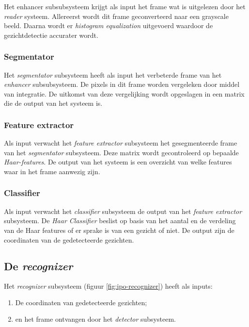 Het enhancer subsubsysteem krijgt als input het frame wat is uitgelezen door
het \emph{reader} systeem. Allereerst wordt dit frame geconverteerd naar een
grayscale beeld. Daarna wordt er \emph{histogram equalization} uitgevoerd
waardoor de gezichtdetectie accurater wordt.

\subsubsection{Segmentator}

Het \emph{segmentator} subsysteem heeft als input
het verbeterde frame van het \emph{enhancer} subsubsysteem. De pixels in dit
frame worden vergeleken door middel van integratie. De uitkomst van deze
vergelijking wordt opgeslagen in een matrix die de output van het systeem is.

\subsubsection{Feature extractor}

Als input verwacht het \emph{feature extractor} subsysteem het gesegmenteerde
frame van het \emph{segmentator} subsysteem. Deze matrix wordt gecontroleerd
op bepaalde \emph{Haar-features}. De output van het systeem is een overzicht
van welke features waar in het frame aanwezig zijn.

\subsubsection{Classifier}

Als input verwacht het \emph{classifier} subsysteem de output van het \emph{feature
extractor} subsysteem. De \emph{Haar Classifier} beslist op basis van het aantal
en de verdeling van de Haar features of er sprake is van een gezicht of niet.
De output zijn de coordinaten van de gedetecteerde gezichten.

\subsection{De \emph{recognizer}}

Het \emph{recognizer} subsysteem (figuur \ref{fig:ipo-recognizer}) heeft als
inputs:

\begin{enumerate}
    \item De coordinaten van gedetecteerde gezichten;
    \item en het frame ontvangen door het \emph{detector} subsysteem.
\end{enumerate}

